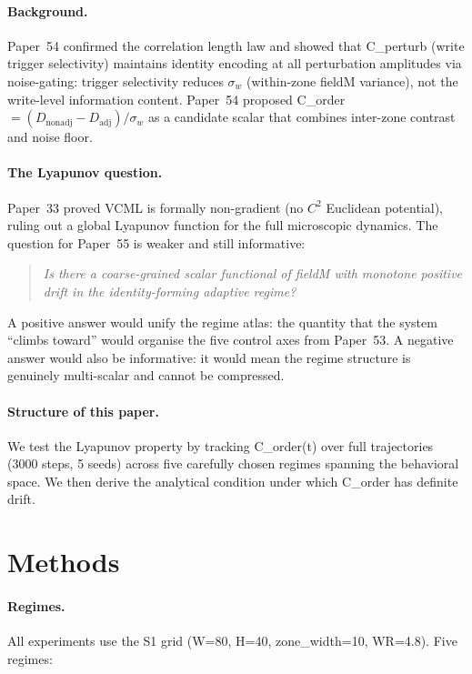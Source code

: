 \documentclass[11pt,a4paper]{article}
\begin{document}
\paragraph{Background.}
Paper~54 confirmed the correlation length law and showed that C\_perturb (write
trigger selectivity) maintains identity encoding at all perturbation amplitudes via
noise-gating: trigger selectivity reduces $\sigma_w$ (within-zone fieldM variance),
not the write-level information content.
Paper~54 proposed C\_order $= (D_\mathrm{nonadj} - D_\mathrm{adj})/\sigma_w$
as a candidate scalar that combines inter-zone contrast and noise floor.

\paragraph{The Lyapunov question.}
Paper~33 proved VCML is formally non-gradient (no $C^2$ Euclidean potential),
ruling out a global Lyapunov function for the full microscopic dynamics.
The question for Paper~55 is weaker and still informative:

\begin{quote}
\emph{Is there a coarse-grained scalar functional of fieldM with monotone
positive drift in the identity-forming adaptive regime?}
\end{quote}

A positive answer would unify the regime atlas: the quantity that the system
``climbs toward'' would organise the five control axes from Paper~53.
A negative answer would also be informative: it would mean the regime structure
is genuinely multi-scalar and cannot be compressed.

\paragraph{Structure of this paper.}
We test the Lyapunov property by tracking C\_order(t) over full trajectories
(3000 steps, 5 seeds) across five carefully chosen regimes spanning the
behavioral space.
We then derive the analytical condition under which C\_order has definite drift.

\section{Methods}

\paragraph{Regimes.}
All experiments use the S1 grid (W=80, H=40, zone\_width=10, WR=4.8).
Five regimes:
\end{document}

